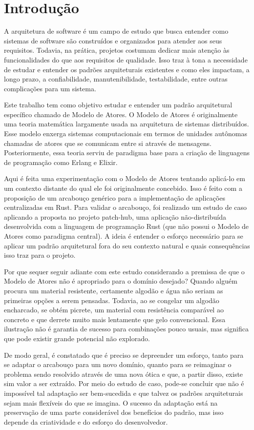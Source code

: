 \chapter{Introdução}

A arquitetura de software é um campo de estudo que busca entender como sistemas de software são construídos e organizados para atender aos seus requisitos. Todavia, na prática, projetos costumam dedicar mais atenção às funcionalidades do que aos requisitos de qualidade. Isso traz à tona a necessidade de estudar e entender os padrões arquiteturais existentes e como eles impactam, a longo prazo, a confiabilidade, manutenibilidade, testabilidade, entre outras complicações para um sistema.

Este trabalho tem como objetivo estudar e entender um padrão arquitetural específico chamado de Modelo de Atores. O Modelo de Atores é originalmente uma teoria matemática largamente usada na arquitetura de sistemas distribuídos. Esse modelo enxerga sistemas computacionais em termos de unidades autônomas chamadas de atores que se comunicam entre si através de mensagens. Posteriormente, essa teoria serviu de paradigma base para a criação de linguagens de programação como Erlang e Elixir. 

Aqui é feita uma experimentação com o Modelo de Atores tentando aplicá-lo em um contexto distante do qual ele foi originalmente concebido. Isso é feito com a proposição de um arcabouço genérico para a implementação de aplicações centralizadas em Rust. Para validar o arcabouço, foi realizado um estudo de caso aplicando a proposta no projeto patch-hub, uma aplicação não-distribuída desenvolvida com a linguagem de programação Rust (que não possui o Modelo de Atores como paradigma central). A ideia é entender o esforço necessário para se aplicar um padrão arquitetural fora do seu contexto natural e quais consequências isso traz para o projeto.

Por que sequer seguir adiante com este estudo considerando a premissa de que o Modelo de Atores não é apropriado para o domínio desejado? Quando alguém procura um material resistente, certamente algodão e água não seriam as primeiras opções a serem pensadas. Todavia, ao se congelar um algodão encharcado, se obtém picrete, um material com resistência comparável ao concreto e que derrete muito mais lentamente que gelo convencional. Essa ilustração não é garantia de sucesso para combinações pouco usuais, mas significa que pode existir grande potencial não explorado.


De modo geral, é constatado que é preciso se depreender um esforço, tanto para se adaptar o arcabouço para um novo domínio, quanto para se reimaginar o problema sendo resolvido através de uma nova ótica e que, a partir disso, existe sim valor a ser extraído. Por meio do estudo de caso, pode-se concluir que não é impossível tal adaptação ser bem-sucedida e que talvez os padrões arquiteturais sejam mais flexíveis do que se imagina. O sucesso da adaptação está na preservação de uma parte considerável dos benefícios do padrão, mas isso depende da criatividade e do esforço do desenvolvedor.

